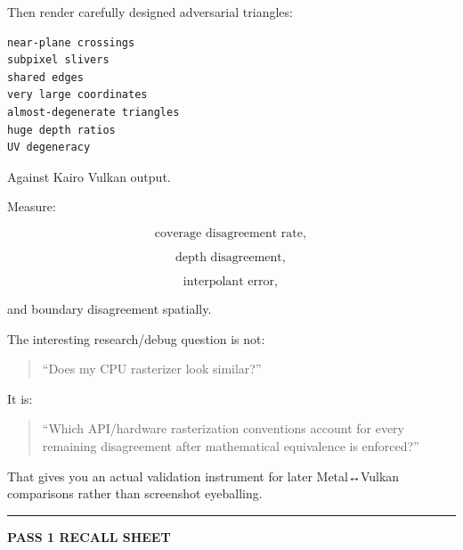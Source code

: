 Then render carefully designed adversarial triangles:

\begin{verbatim}
near-plane crossings
subpixel slivers
shared edges
very large coordinates
almost-degenerate triangles
huge depth ratios
UV degeneracy
\end{verbatim}

Against Kairo Vulkan output.

Measure:

\[
\text{coverage disagreement rate},
\]

\[
\text{depth disagreement},
\]

\[
\text{interpolant error},
\]

and boundary disagreement spatially.

The interesting research/debug question is not:

\begin{quote}
``Does my CPU rasterizer look similar?''
\end{quote}

It is:

\begin{quote}
``Which API/hardware rasterization conventions account for every remaining disagreement after mathematical equivalence is enforced?''
\end{quote}

That gives you an actual validation instrument for later Metal↔Vulkan comparisons rather than screenshot eyeballing.

\begin{center}\rule{0.5\linewidth}{0.5pt}\end{center}

\textbf{PASS 1 RECALL SHEET}

